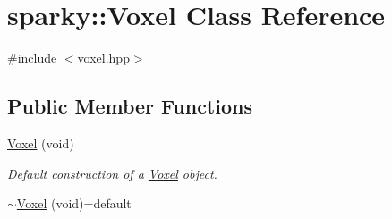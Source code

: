 \hypertarget{classsparky_1_1_voxel}{}\section{sparky\+:\+:Voxel Class Reference}
\label{classsparky_1_1_voxel}


{\ttfamily \#include $<$voxel.\+hpp$>$}

\subsection*{Public Member Functions}
\begin{DoxyCompactItemize}
\item 
\hyperlink{classsparky_1_1_voxel_a8bb2ca52d35a0e2e6594801b345203e2}{Voxel} (void)
\begin{DoxyCompactList}\small\item\em Default construction of a \hyperlink{classsparky_1_1_voxel}{Voxel} object. \end{DoxyCompactList}\item 
\hyperlink{classsparky_1_1_voxel_a49d8f59dbd5ec3baa3b3fce419abb0bf}{$\sim$\+Voxel} (void)=default\hypertarget{classsparky_1_1_voxel_a49d8f59dbd5ec3baa3b3fce419abb0bf}{}\label{classsparky_1_1_voxel_a49d8f59dbd5ec3baa3b3fce419abb0bf}


\end{DoxyCompactItemize}
